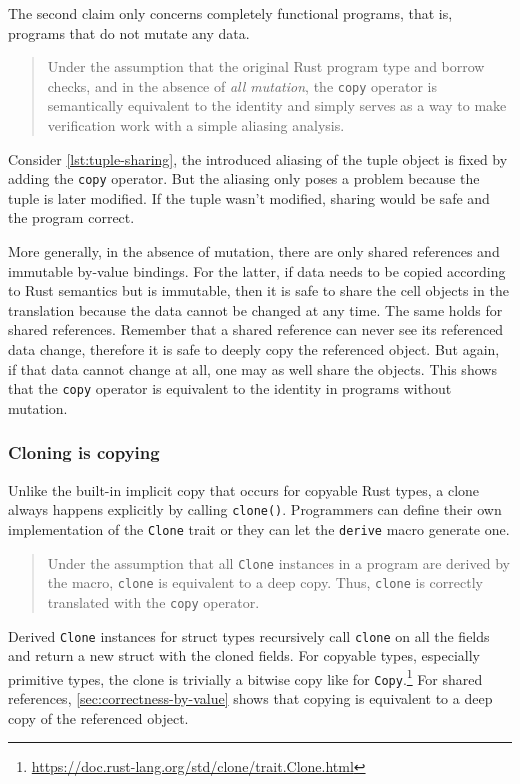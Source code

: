 The second claim only concerns completely functional programs, that is, programs
that do not mutate any data.

\begin{quote}
Under the assumption that the original Rust program type and borrow checks, and
in the absence of \emph{all mutation}, the \lstinline!copy! operator is
semantically equivalent to the identity and simply serves as a way to make
verification work with a simple aliasing analysis.
\end{quote}

Consider \autoref{lst:tuple-sharing}, the introduced aliasing of the tuple
object is fixed by adding the \lstinline!copy! operator. But the aliasing only
poses a problem because the tuple is later modified. If the tuple wasn't
modified, sharing would be safe and the program correct.

More generally, in the absence of mutation, there are only shared references and
immutable by-value bindings. For the latter, if data needs to be copied
according to Rust semantics but is immutable, then it is safe to share the cell
objects in the translation because the data cannot be changed at any time. The
same holds for shared references. Remember that a shared reference can never see
its referenced data change, therefore it is safe to deeply copy the referenced
object. But again, if that data cannot change at all, one may as well share the
objects. This shows that the \lstinline!copy! operator is equivalent to the
identity in programs without mutation.

\subsubsection{Cloning is copying}
\label{sec:clone-is-copy}

Unlike the built-in implicit copy that occurs for copyable Rust types, a clone
always happens explicitly by calling \lstinline!clone()!. Programmers can define
their own implementation of the \lstinline!Clone! trait or they can let the
\lstinline!derive! macro generate one.

\begin{quote}
Under the assumption that all \lstinline!Clone! instances in a program are
derived by the macro, \lstinline!clone! is equivalent to a deep copy. Thus,
\lstinline!clone! is correctly translated with the \lstinline!copy! operator.
\end{quote}

Derived \lstinline!Clone! instances for struct types recursively call
\lstinline!clone! on all the fields and return a new struct with the cloned
fields. For copyable types, especially primitive types, the clone is trivially a
bitwise copy like for
\lstinline!Copy!.\footnote{\url{https://doc.rust-lang.org/std/clone/trait.Clone.html}}
For shared references, \autoref{sec:correctness-by-value} shows that copying is
equivalent to a deep copy of the referenced object.


